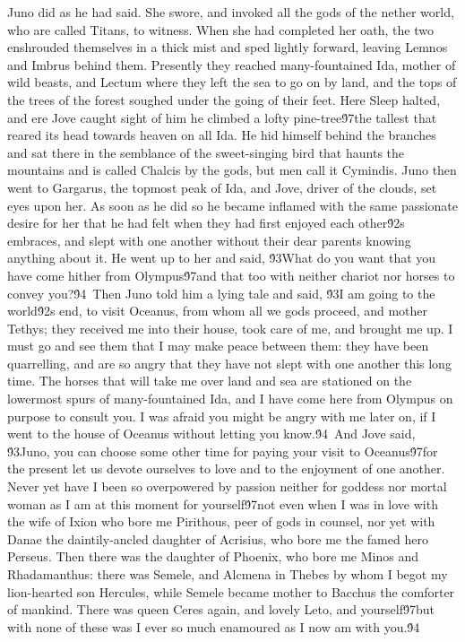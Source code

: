 {Juno did as he had said. She swore, and invoked all the gods of the nether world, who are called Titans, to witness. When she had completed her oath, the two enshrouded themselves in a thick mist and sped lightly forward, leaving Lemnos and Imbrus behind them. Presently they reached many-fountained Ida, mother of wild beasts, and Lectum where they left the sea to go on by land, and the tops of the trees of the forest soughed under the going of their feet. Here Sleep halted, and ere Jove caught sight of him he climbed a lofty pine-tree\'97the tallest that reared its head towards heaven on all Ida. He hid himself behind the branches and sat there in the semblance of the sweet-singing bird that haunts the mountains and is called Chalcis by the gods, but men call it Cymindis. Juno then went to Gargarus, the topmost peak of Ida, and Jove, driver of the clouds, set eyes upon her. As soon as he did so he became inflamed with the same passionate desire for her that he had felt when they had first enjoyed each other\'92s embraces, and slept with one another without their dear parents knowing anything about it. He went up to her and said, \'93What do you want that you have come hither from Olympus\'97and that too with neither chariot nor horses to convey you?\'94\
Then Juno told him a lying tale and said, \'93I am going to the world\'92s end, to visit Oceanus, from whom all we gods proceed, and mother Tethys; they received me into their house, took care of me, and brought me up. I must go and see them that I may make peace between them: they have been quarrelling, and are so angry that they have not slept with one another this long time. The horses that will take me over land and sea are stationed on the lowermost spurs of many-fountained Ida, and I have come here from Olympus on purpose to consult you. I was afraid you might be angry with me later on, if I went to the house of Oceanus without letting you know.\'94\
And Jove said, \'93Juno, you can choose some other time for paying your visit to Oceanus\'97for the present let us devote ourselves to love and to the enjoyment of one another. Never yet have I been so overpowered by passion neither for goddess nor mortal woman as I am at this moment for yourself\'97not even when I was in love with the wife of Ixion who bore me Pirithous, peer of gods in counsel, nor yet with Danae the daintily-ancled daughter of Acrisius, who bore me the famed hero Perseus. Then there was the daughter of Phoenix, who bore me Minos and Rhadamanthus: there was Semele, and Alcmena in Thebes by whom I begot my lion-hearted son Hercules, while Semele became mother to Bacchus the comforter of mankind. There was queen Ceres again, and lovely Leto, and yourself\'97but with none of these was I ever so much enamoured as I now am with you.\'94\
}
